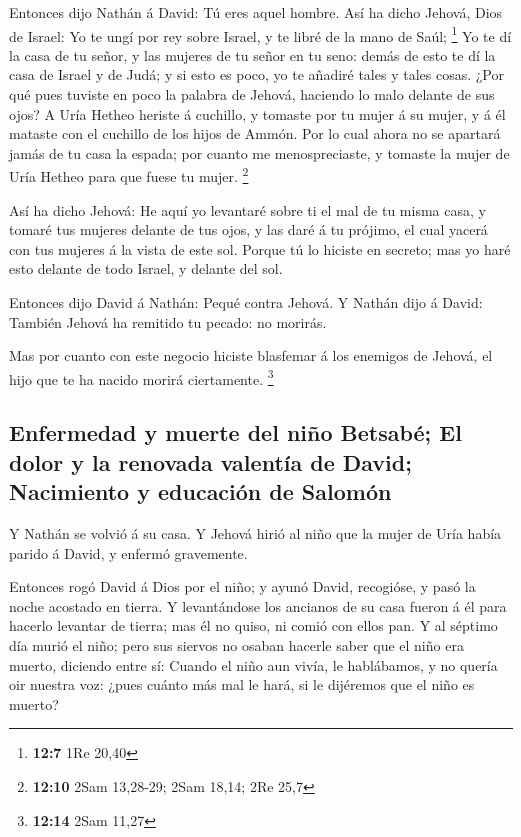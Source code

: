  Entonces dijo Nathán á David: Tú eres aquel hombre. Así
ha dicho Jehová, Dios de Israel: Yo te ungí por rey sobre Israel, y te
libré de la mano de Saúl; \footnote{\textbf{12:7} 1Re 20,40}
 Yo te dí la casa de tu señor, y las mujeres de tu señor
en tu seno: demás de esto te dí la casa de Israel y de Judá; y si esto
es poco, yo te añadiré tales y tales cosas.  ¿Por qué pues
tuviste en poco la palabra de Jehová, haciendo lo malo delante de sus
ojos? A Uría Hetheo heriste á cuchillo, y tomaste por tu mujer á su
mujer, y á él mataste con el cuchillo de los hijos de Ammón.
 Por lo cual ahora no se apartará jamás de tu casa la
espada; por cuanto me menospreciaste, y tomaste la mujer de Uría Hetheo
para que fuese tu mujer. \footnote{\textbf{12:10} 2Sam 13,28-29; 2Sam
  18,14; 2Re 25,7}

 Así ha dicho Jehová: He aquí yo levantaré sobre ti el
mal de tu misma casa, y tomaré tus mujeres delante de tus ojos, y las
daré á tu prójimo, el cual yacerá con tus mujeres á la vista de este
sol.  Porque tú lo hiciste en secreto; mas yo haré esto
delante de todo Israel, y delante del sol.

 Entonces dijo David á Nathán: Pequé contra Jehová. Y
Nathán dijo á David: También Jehová ha remitido tu pecado: no morirás.

 Mas por cuanto con este negocio hiciste blasfemar á los
enemigos de Jehová, el hijo que te ha nacido morirá ciertamente.
\footnote{\textbf{12:14} 2Sam 11,27}

\hypertarget{enfermedad-y-muerte-del-niuxf1o-betsabuxe9-el-dolor-y-la-renovada-valentuxeda-de-david-nacimiento-y-educaciuxf3n-de-salomuxf3n}{%
\subsection{Enfermedad y muerte del niño Betsabé; El dolor y la renovada
valentía de David; Nacimiento y educación de
Salomón}\label{enfermedad-y-muerte-del-niuxf1o-betsabuxe9-el-dolor-y-la-renovada-valentuxeda-de-david-nacimiento-y-educaciuxf3n-de-salomuxf3n}}

 Y Nathán se volvió á su casa. Y Jehová hirió al niño que
la mujer de Uría había parido á David, y enfermó gravemente.

 Entonces rogó David á Dios por el niño; y ayunó David,
recogióse, y pasó la noche acostado en tierra.  Y
levantándose los ancianos de su casa fueron á él para hacerlo levantar
de tierra; mas él no quiso, ni comió con ellos pan.  Y al
séptimo día murió el niño; pero sus siervos no osaban hacerle saber que
el niño era muerto, diciendo entre sí: Cuando el niño aun vivía, le
hablábamos, y no quería oir nuestra voz: ¿pues cuánto más mal le hará,
si le dijéremos que el niño es muerto?

